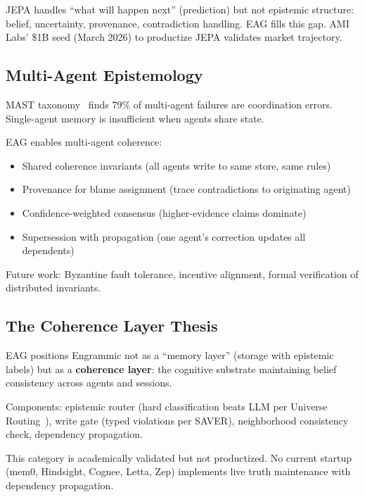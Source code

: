\documentclass[11pt,a4paper]{article}
\begin{document}
JEPA handles ``what will happen next'' (prediction) but not epistemic structure: belief, uncertainty, provenance, contradiction handling. EAG fills this gap. AMI Labs' \$1B seed (March 2026) to productize JEPA validates market trajectory.

\subsection{Multi-Agent Epistemology}

MAST taxonomy~\cite{mast2025} finds 79\% of multi-agent failures are coordination errors. Single-agent memory is insufficient when agents share state.

EAG enables multi-agent coherence:
\begin{itemize}[noitemsep]
    \item Shared coherence invariants (all agents write to same store, same rules)
    \item Provenance for blame assignment (trace contradictions to originating agent)
    \item Confidence-weighted consensus (higher-evidence claims dominate)
    \item Supersession with propagation (one agent's correction updates all dependents)
\end{itemize}

Future work: Byzantine fault tolerance, incentive alignment, formal verification of distributed invariants.

\subsection{The Coherence Layer Thesis}

EAG positions Engrammic not as a ``memory layer'' (storage with epistemic labels) but as a \textbf{coherence layer}: the cognitive substrate maintaining belief consistency across agents and sessions.

Components: epistemic router (hard classification beats LLM per Universe Routing~\cite{universe2026}), write gate (typed violations per SAVER), neighborhood consistency check, dependency propagation.

This category is academically validated but not productized. No current startup (mem0, Hindsight, Cognee, Letta, Zep) implements live truth maintenance with dependency propagation.

\end{document}
